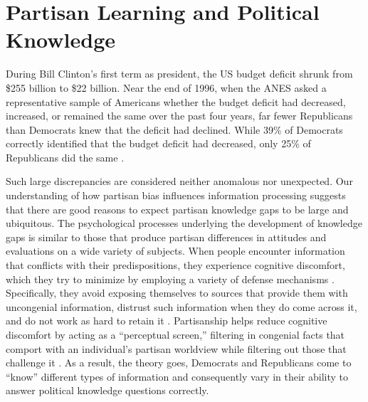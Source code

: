 \documentclass[12pt, letterpaper]{article}
\begin{document}
\section*{Partisan Learning and Political Knowledge}

During Bill Clinton's first term as president, the US budget deficit shrunk from \$255 billion to \$22 billion. Near the end of 1996, when the ANES asked a representative sample of Americans whether the budget deficit had decreased, increased, or remained the same over the past four years, far fewer Republicans than Democrats knew that the deficit had declined. While 39\% of Democrats correctly identified that the budget deficit had decreased, only 25\% of Republicans did the same \citep[280]{achen2016democracy}.

Such large discrepancies are considered neither anomalous nor unexpected. Our understanding of how partisan bias influences information processing suggests that there are good reasons to expect partisan knowledge gaps to be large and ubiquitous. The psychological processes underlying the development of knowledge gaps is similar to those that produce partisan differences in attitudes and evaluations on a wide variety of subjects. When people encounter information that conflicts with their predispositions, they experience cognitive discomfort, which they try to minimize by employing a variety of defense mechanisms \citep[e.g.,][]{abelson1959modes,festinger1962theory}. Specifically, they avoid exposing themselves to sources that provide them with uncongenial information, distrust such information when they do come across it, and do not work as hard to retain it \citep{bartels_2002, jerit2012partisan, lodgetaber_2013}. Partisanship helps reduce cognitive discomfort by acting as a ``perceptual screen,'' filtering in congenial facts that comport with an individual's partisan worldview while filtering out those that challenge it \citep{campbell1960, Zaller1992}. As a result, the theory goes, Democrats and Republicans come to ``know'' different types of information and consequently vary in their ability to answer political knowledge questions correctly.
\end{document}

